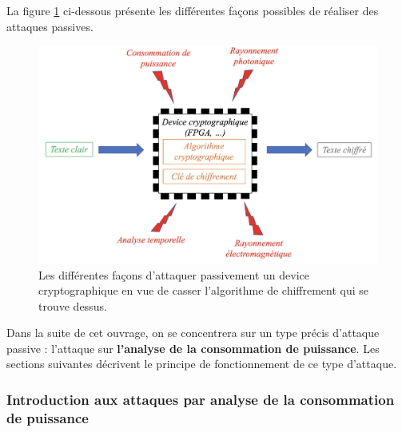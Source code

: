 \documentclass[10pt, oneside, a4paper]{article}
\begin{document}
La figure \ref{fig:attackpassive} ci-dessous présente les différentes façons possibles de réaliser des attaques passives.
\begin{figure}[htbp]
    \centering
    \includegraphics[scale=0.4]{image/attackpassive}
    \caption{Les différentes façons d'attaquer passivement un device cryptographique en vue de casser l'algorithme de chiffrement qui se trouve dessus.}
    \label{fig:attackpassive}
\end{figure}

Dans la suite de cet ouvrage, on se concentrera sur un type précis d'attaque passive : l'attaque sur \textbf{l'analyse de la consommation de puissance}. Les sections suivantes décrivent le principe de fonctionnement de ce type d'attaque. 

\subsubsection{Introduction aux attaques par analyse de la consommation de puissance}
\end{document}
